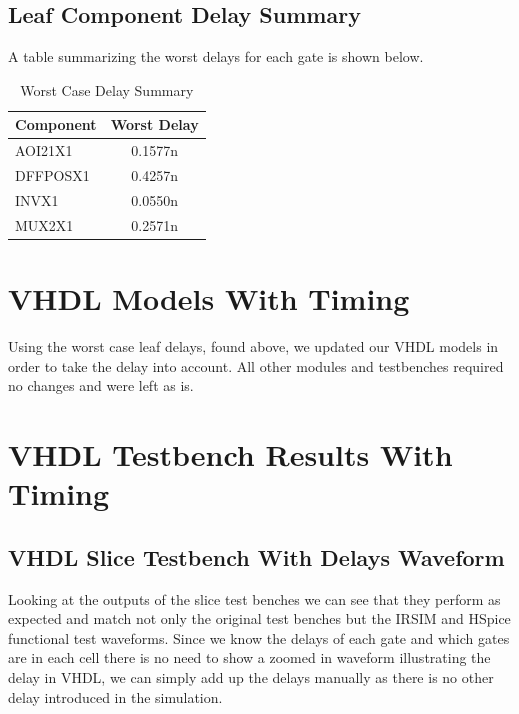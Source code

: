     \vspace{2\baselineskip}
    \subsection{Leaf Component Delay Summary}

        A table summarizing the worst delays for each gate is shown below.

        \begin{table}[H]
            \centering
            \begin{tabular}{lc}
                \toprule
                \textbf{Component} & \textbf{Worst Delay} \\
                \midrule
                AOI21X1  & 0.1577n \\
                DFFPOSX1 & 0.4257n \\
                INVX1    & 0.0550n \\
                MUX2X1   & 0.2571n \\
                \bottomrule
            \end{tabular}
            \caption{Worst Case Delay Summary}
        \end{table}

\newpage
\section{VHDL Models With Timing}
    Using the worst case leaf delays, found above, we updated our VHDL models
    in order to take the delay into account.  All other modules and testbenches
    required no changes and were left as is.
    
    
    
    
\section{VHDL Testbench Results With Timing}

    \subsection{VHDL Slice Testbench With Delays Waveform}

        Looking at the outputs of the slice test benches we can see that they
        perform as expected and match not only the original test benches but
        the IRSIM and HSpice functional test waveforms.  Since we know the
        delays of each gate and which gates are in each cell there is no need
        to show a zoomed in waveform illustrating the delay in VHDL, we can
        simply add up the delays manually as there is no other delay introduced
        in the simulation.


